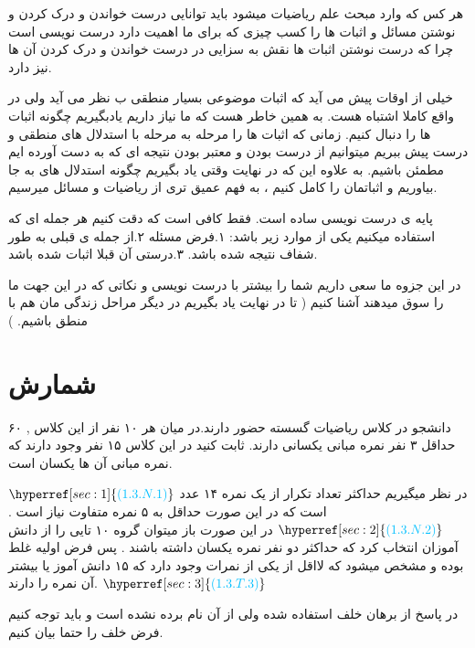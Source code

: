\documentclass[11pt,largemargins]{h2wp}
\begin{document}
\maketitle

هر کس که وارد مبحث علم ریاضیات میشود باید توانایی درست خواندن و درک کردن و نوشتن مسائل و اثبات ها را کسب 
چیزی که برای ما اهمیت دارد درست نویسی است چرا که درست نوشتن اثبات ها نقش به سزایی در درست خواندن و درک کردن آن ها نیز دارد.

خیلی از اوقات پیش می آید که اثبات موضوعی بسیار منطقی ب نظر می آید ولی در واقع کاملا اشتباه هست. 
به همین خاطر هست که ما نیاز داریم یادبگیریم چگونه اثبات ها را دنبال کنیم.
زمانی که اثبات ها را مرحله به مرحله با استدلال های منطقی و درست پیش ببریم میتوانیم از درست بودن و معتبر بودن نتیجه ای که به دست آورده ایم مطمئن باشیم.
به علاوه این که در نهایت وقتی یاد بگیریم چگونه استدلال های به جا بیاوریم و اثباتمان را کامل کنیم ، به فهم عمیق تری از ریاضیات و مسائل میرسیم.

پایه ی درست نویسی ساده است.
فقط کافی است که دقت کنیم هر جمله ای که استفاده میکنیم یکی از موارد زیر باشد:
۱.فرض مسئله
۲.از جمله ی قبلی به طور شفاف نتیجه شده باشد.
۳.درستی آن قبلا اثبات شده باشد.

در این جزوه ما سعی داریم شما را بیشتر با درست نویسی و نکاتی که در این جهت ما را سوق میدهند آشنا کنیم ( تا در نهایت یاد بگیریم در دیگر مراحل زندگی مان هم با منطق باشیم. )

\chapter*{شمارش}

\question
\question

\question
۶۰ دانشجو در کلاس ریاضیات گسسته حضور دارند.در میان هر ۱۰ نفر از این کلاس , حداقل ۳ نفر نمره مبانی یکسانی دارند. ثابت کنید در این کلاس ۱۵ نفر وجود دارند که نمره مبانی آن ها یکسان است.

\solution
$ \hyperref[sec:1]{\textcolor{capri}{(1.3.N.1)}} $
در نظر میگیریم حداکثر تعداد تکرار از یک نمره ۱۴ عدد است که در این صورت حداقل به ۵ نمره متفاوت نیاز است . 
 $ \hyperref[sec:2]{\textcolor{capri}{(1.3.N.2)}} $
در این صورت باز میتوان گروه ۱۰ تایی را از دانش آموزان انتخاب کرد که حداکثر دو نفر نمره یکسان داشته باشند . پس فرض اولیه غلط بوده و مشخص میشود که لااقل از یکی از نمرات وجود دارد که ۱۵ دانش آموز یا بیشتر 
آن نمره را دارند.
 $ \hyperref[sec:3]{\textcolor{capri}{(1.3.T.3)}}  $


\notes

\Nnote
در پاسخ از برهان خلف استفاده شده ولی از آن نام برده نشده است و باید توجه کنیم فرض خلف را حتما بیان کنیم.
\label{sec:1}
\end{document}
